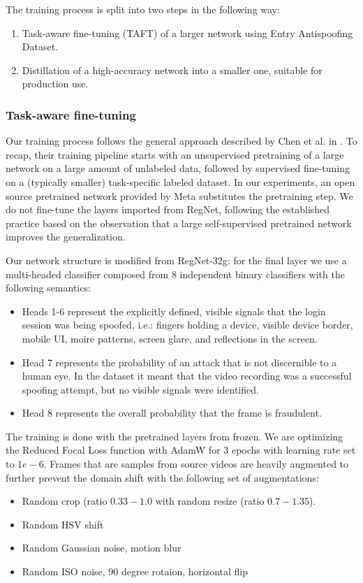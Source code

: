 \documentclass[10pt,twocolumn,letterpaper]{article}
\begin{document}
The training process is split into two steps in the following way:
\begin{enumerate}
    \item Task-aware fine-tuning (TAFT) of a larger network using Entry Antispoofing Dataset. 
    \item Distillation of a high-accuracy network into a smaller one, suitable for production use.
\end{enumerate}

\subsubsection{Task-aware fine-tuning}

Our training process follows the general approach described by Chen et al. in \cite{big-self-supervised}. To recap, their training pipeline starts with an unsupervised pretraining of a large network on a large amount of unlabeled data, followed by supervised fine-tuning on a (typically smaller) task-specific labeled dataset. In our experiments, an open source pretrained network provided by Meta \cite{SEER} substitutes the pretraining step. We do not fine-tune the layers imported from RegNet, following the established practice \cite{big-self-supervised} \cite{SEER} based on the observation that a large self-supervised pretrained network improves the generalization.

Our network structure is modified from RegNet-32g\cite{SEER}: for the final layer we use a multi-headed classifier composed from $8$ independent binary classifiers with the following semantics:

\begin{itemize}
    \item Heads 1-6 represent the explicitly defined, visible signals that the login session was being spoofed, i.e.: fingers holding a device, visible device border, mobile UI, moire patterns, screen glare, and reflections in the screen.
    \item Head 7 represents the probability of an attack that is not discernible to a human eye. In the dataset it meant that the video recording was a successful spoofing attempt, but no visible signals were identified.
    \item Head 8 represents the overall probability that the frame is fraudulent.
\end{itemize}

The training is done with the pretrained layers from \cite{SEER} frozen. We are optimizing the Reduced Focal Loss function \cite{ReducedFocalLoss} with AdamW\cite{AdamW} for 3 epochs with learning rate set to $1e-6$. Frames that are samples from source videos are heavily augmented to further prevent the domain shift with the following set of augmentations:
\begin{itemize}
    \item Random crop (ratio $0.33 - 1.0$ with random resize (ratio $0.7 - 1.35$).
    \item Random HSV shift
    \item Random Gaussian noise, motion blur
    \item Random ISO noise, 90 degree rotaion, horizontal flip
\end{itemize}
\end{document}
